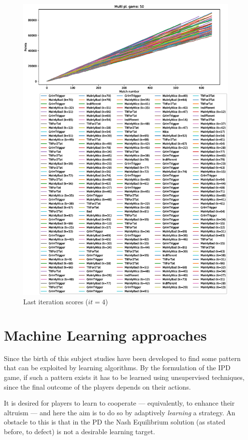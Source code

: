 \documentclass[journal,10pt,twoside]{IEEEtran}
\begin{document}
\begin{figure}[!ht]
    \centering
    \includegraphics[width=1\columnwidth]{../img/cipdmp-incr/cipdmp-scores-increasing-pop-50-r4}
    \caption{Last iteration scores ($it=4$)}
    \label{fig:incrCLI}
\end{figure}

\section{Machine Learning approaches} \label{s:ml}
Since the birth of this subject studies have been developed to find some pattern that can be exploited by learning algorithms.
By the formulation of the IPD game, if such a pattern exists it has to be learned using unsupervised techniques, since the final outcome of the players depends on their actions.

It is desired for players to learn to cooperate --- equivalently, to enhance their altruism --- and here the aim is to do so by adaptively \textit{learning} a strategy. An obstacle to this is that in the PD the Nash Equilibrium solution (as stated before, to defect) is not a desirable learning target.~\cite{coopSeqRL}
\end{document}
